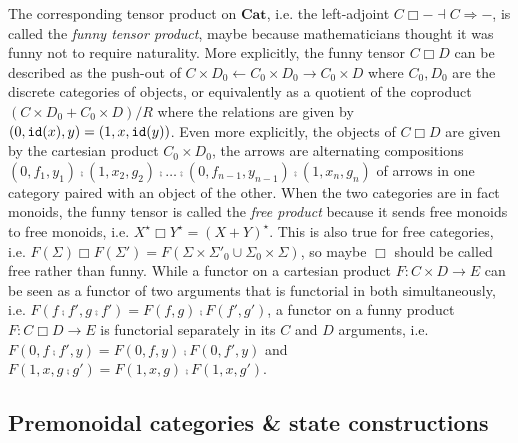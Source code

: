 The corresponding tensor product on $\mathbf{Cat}$, i.e. the left-adjoint $C \Box - \dashv C \Rightarrow -$, is called the \emph{funny tensor product}, maybe because mathematicians thought it was funny not to require naturality.
More explicitly, the funny tensor $C \Box D$ can be described as the push-out of $C \times D_0 \leftarrow C_0 \times D_0 \to C_0 \times D$ where $C_0, D_0$ are the discrete categories of objects, or equivalently as a quotient of the coproduct $(C \times D_0 + C_0 \times D) / R$ where the relations are given by $(0, \mathtt{id}(x), y) = (1, x, \mathtt{id}(y))$.
Even more explicitly, the objects of $C \Box D$ are given by the cartesian product $C_0 \times D_0$, the arrows are alternating compositions $(0, f_1, y_1) \fcmp (1, x_2, g_2) \fcmp \dots \fcmp (0, f_{n - 1}, y_{n -1}) \fcmp (1, x_n, g_n)$ of arrows in one category paired with an object of the other.
When the two categories are in fact monoids, the funny tensor is called the \emph{free product} because it sends free monoids to free monoids, i.e. $X^\star \Box Y^\star = (X + Y)^\star$.
This is also true for free categories, i.e. $F(\Sigma) \Box F(\Sigma') = F(\Sigma \times \Sigma'_0 \cup \Sigma_0 \times \Sigma)$, so maybe $\Box$ should be called free rather than funny.
While a functor on a cartesian product $F : C \times D \to E$ can be seen as a functor of two arguments that is functorial in both simultaneously, i.e. $F(f \fcmp f', g \fcmp f') = F(f, g) \fcmp F(f', g')$, a functor on a funny product $F : C \Box D \to E$ is functorial separately in its $C$ and $D$ arguments, i.e. $F(0, f \fcmp f', y) = F(0, f, y) \fcmp F(0, f', y)$ and $F(1, x, g \fcmp g') = F(1, x, g) \fcmp F(1, x, g')$.

\subsection{Premonoidal categories \& state constructions}\label{subsection:state-construction}

